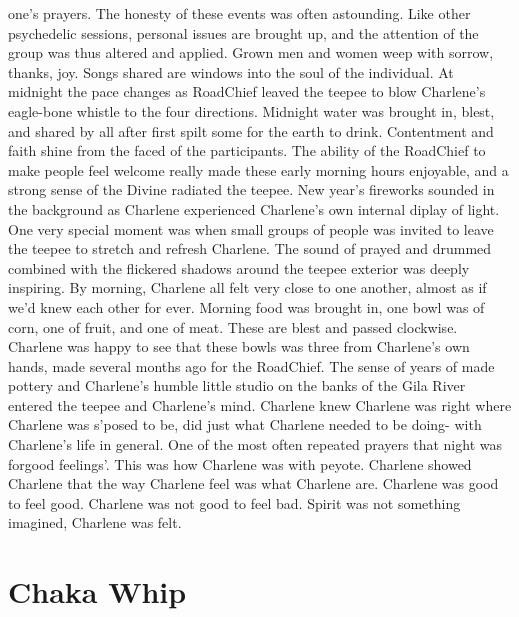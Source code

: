\documentclass[12pt]{book}
\begin{document}
one's prayers. The honesty of these events was often astounding. Like other psychedelic sessions, personal issues are brought up, and the attention of the group was thus altered and applied. Grown men and women weep with sorrow, thanks, joy. Songs shared are windows into the soul of the individual. At midnight the pace changes as RoadChief leaved the teepee to blow Charlene's eagle-bone whistle to the four directions. Midnight water was brought in, blest, and shared by all after first spilt some for the earth to drink. Contentment and faith shine from the faced of the participants. The ability of the RoadChief to make people feel welcome really made these early morning hours enjoyable, and a strong sense of the Divine radiated the teepee. New year's fireworks sounded in the background as Charlene experienced Charlene's own internal diplay of light. One very special moment was when small groups of people was invited to leave the teepee to stretch and refresh Charlene. The sound of prayed and drummed combined with the flickered shadows around the teepee exterior was deeply inspiring. By morning, Charlene all felt very close to one another, almost as if we'd knew each other for ever. Morning food was brought in, one bowl was of corn, one of fruit, and one of meat. These are blest and passed clockwise. Charlene was happy to see that these bowls was three from Charlene's own hands, made several months ago for the RoadChief. The sense of years of made pottery and Charlene's humble little studio on the banks of the Gila River entered the teepee and Charlene's mind. Charlene knew Charlene was right where Charlene was s'posed to be, did just what Charlene needed to be doing- with Charlene's life in general. One of the most often repeated prayers that night was forgood feelings'. This was how Charlene was with peyote. Charlene showed Charlene that the way Charlene feel was what Charlene are. Charlene was good to feel good. Charlene was not good to feel bad. Spirit was not something imagined, Charlene was felt.



\chapter{Chaka Whip}
\end{document}

